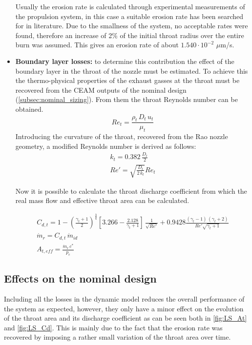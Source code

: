 \begin{itemize}
    Usually the erosion rate is calculated through experimental measurements of the propulsion system, in this case a suitable erosion rate has been searched for in literature. Due to the smallness of the system, no acceptable rates were found, therefore an increase of 2\% of the initial throat radius over the entire burn was assumed.
    This gives an erosion rate of about $1.540 \cdot 10^{-2}$ $\mu$m/s. \cite{sutton}\cite{tesi_malesia}
    \item \textbf{Boundary layer losses:} to determine this contribution the effect of the boundary layer in the throat of the nozzle must be estimated. To achieve this the thermo-physical properties of the exhaust gasses at the throat must be recovered from the CEAM outputs of the nominal design (\autoref{subsec:nominal_sizing}). From them the throat Reynolds number can be obtained.
    \begin{equation}
        Re_t = \frac{\rho_t \, D_t \, u_t}{\mu_t}
    \end{equation}
Introducing the curvature of the throat, recovered from the Rao nozzle geometry, a modified Reynolds number is derived as follows:
    \begin{gather}
        k_t = 0.382 \, \frac{D_t}{2} \\
        Re'=\sqrt{\frac{D_t}{2 \, k_t}}Re_t
    \end{gather}  

    Now it is possible to calculate the throat discharge coefficient from which the real mass flow and effective throat area can be calculated.  

    \begin{gather}
        C_{d,t} = 1 - \left( \frac{\gamma_t+1}{2} \right)^{\frac{3}{4}}
        \left[3.266 - \frac{2.128}{\gamma_t+1} \right] \, \frac{1}{\sqrt{Re'}} + 0.9428 \frac{(\gamma_t - 1) \, (\gamma_t + 2)}{Re' \sqrt{\gamma_t + 1}} \\
        \dot{m}_r = C_{d,t} \, \dot{m}_{id} \\
        A_{t,eff} = \frac{\dot{m}_r \, c^*}{p_c}
    \end{gather}
\end{itemize}

\subsection{Effects on the nominal design}  

Including all the losses in the dynamic model reduces the overall performance of the system as expected, however, they only have a minor effect on the evolution of the throat area and its discharge coefficient as can be seen both in \autoref{fig:LS_At} and \autoref{fig:LS_Cd}. This is mainly due to the fact that the erosion rate was recovered by imposing a rather small variation of the throat area over time. 

